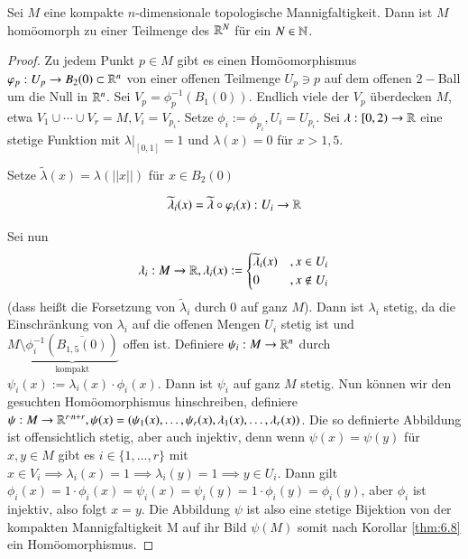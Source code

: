\documentclass[a4paper,10pt]{scrartcl}
\begin{document}
\begin{st}
 Sei $M$ eine kompakte $n$-dimensionale topologische Mannigfaltigkeit. Dann ist $M$ homöomorph zu einer Teilmenge des $\mathbb{R}^N$ für ein $N\in \mathbb{N}$.
\end{st}
\begin{figure}[H]
\centering
 \fixme[fig36]
\caption{}
\end{figure}
\begin{proof}
 Zu jedem Punkt $p\in M$ gibt es einen Homöomorphismus $\varphi_p: U_p\to B_2(0) \subset \mathbb{R}^n$ von einer offenen Teilmenge $U_p\ni p$ auf dem offenen $2-$Ball um die Null in $\mathbb{R}^n$. Sei $V_p=\phi_p^{-1}(B_1(0))$. Endlich viele der $V_p$ überdecken $M$, etwa $V_1 \cup \dotsb \cup V_r=M, V_i=V_{p_i}$. Setze $\phi_i:=\phi_{p_i}, U_i=U_{p_i}$. Sei $\lambda:[0,2)\to \mathbb{R}$ eine stetige Funktion mit $\lambda|_{[0,1]}=1$ und $\lambda(x)=0$ für $x>1,5$.
\begin{figure}[H]
\centering
 
\caption{}
\end{figure}
Setze $\tilde \lambda(x)=\lambda(||x||)$ für $x\in B_2(0)$\\
\begin{figure}[H]
\centering
 \fixme[fig38]
\caption{}
\end{figure}
\[
 \widetilde \lambda_i(x)=\widetilde\lambda \circ \varphi_i(x): U_i\to \mathbb{R}
\]
\begin{figure}[H]
\centering
 \fixme[fig39]
\caption{}
\end{figure}
Sei nun 
\[
 \lambda_i: M \to \mathbb{R}, \lambda_i(x):=\begin{cases} \widetilde \lambda_i(x)&, x\in U_i\\ 0 &,x \notin U_i \end{cases}
\]
(dass heißt die Forsetzung von $\tilde\lambda_i$ durch $0$ auf ganz $M$). Dann ist $\lambda_i$ stetig, da die Einschränkung von $\lambda_i$ auf die offenen Mengen $U_i$ stetig ist und $M\setminus \underbrace{\phi_i^{-1}(\overline{B_{1,5}(0)})}_{\text{kompakt}}$ offen ist. Definiere $\psi_i: M\to \mathbb{R}^n$ durch $\psi_i(x):= \lambda_i(x)\cdot \phi_i(x)$. Dann ist $\psi_i$ auf ganz $M$ stetig.  Nun können wir den gesuchten Homöomorphismus hinschreiben, definiere $\psi: M\to \mathbb{R}^{r\cdot n+r} , \psi(x)=(\psi_1(x),\dotsc  , \psi_r(x), \lambda_1(x),\dotsc  , \lambda_r(x))$. Die so definierte Abbildung ist offensichtlich stetig, aber auch injektiv, denn wenn $\psi(x)=\psi(y)$ für $x,y\in M$ gibt es $i\in \{1,\dotsc  , r\}$ mit $x\in V_i \implies \lambda_i(x)=1 \implies \lambda_i(y)=1 \implies y \in U_i$. Dann gilt $\phi_i(x)=1\cdot \phi_i(x)=\psi_i(x)=\psi_i(y)=1\cdot \phi_i(y)= \phi_i(y)$, aber $\phi_i$ ist injektiv, also folgt $x=y$. Die Abbildung $\psi$ ist also eine stetige Bijektion von der kompakten Mannigfaltigkeit M auf ihr Bild $\psi(M)$ somit nach Korollar \ref{thm:6.8} ein Homöomorphismus.
\end{proof}
\end{document}
